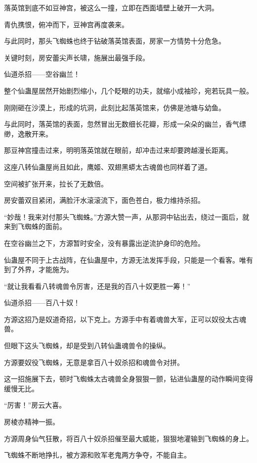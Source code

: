 
\begin{this_body}

落英馆到底不如豆神宫，被这么一撞，立即在西面墙壁上破开一大洞。

青仇携恨，俯冲而下，豆神宫再度袭来。

与此同时，那头飞蜘蛛也终于钻破落英馆表面，房家一方情势十分危急。

关键时刻，房安蕾尖声长啸，施展出最强手段。

仙道杀招——空谷幽兰！

整个仙蛊屋居然开始剧烈缩小，几个眨眼的功夫，就缩小成袖珍，宛若玩具一般。

刚刚砸在沙漠上，形成的坑洞，此刻比起落英馆来，仿佛是池塘与幼鱼。

与此同时，落英馆的表面，忽然冒出无数细长花瓣，形成一朵朵的幽兰，香气缥缈，逸散开来。

那豆神宫撞击过来，明明落英馆就在眼前，却冲击过来却要跨越漫长距离。

这座八转仙蛊屋尚且如此，鹰姬、双翅黑蟒太古魂兽也同样着了道。

空间被扩张开来，拉长了无数倍。

房安蕾双目紧闭，满脸汗水滚滚流下，面色苍白，极力维持杀招。

“妙哉！我来对付那头飞蜘蛛。”方源大赞一声，从那洞中钻出去，绕过一面后，就来到飞蜘蛛的面前。

在空谷幽兰之下，方源暂时安全，没有暴露出逆流护身印的危险。

仙蛊屋不同于上古战阵，在仙蛊屋中，方源无法发挥手段，只能是一个看客。唯有到了外界，才能施为。

“就让我看看八转魂兽令厉害，还是我的百八十奴更胜一筹！”

仙道杀招——百八十奴！

方源这招乃是奴道奇招，以下克上。方源手中有着魂兽大军，正可以奴役太古魂兽。

但眼下这头飞蜘蛛，却是受到八转仙蛊魂兽令的操纵。

方源要奴役飞蜘蛛，无意是拿百八十奴杀招和魂兽令对拼。

这一招施展下去，顿时飞蜘蛛太古魂兽全身狠狠一颤，钻进仙蛊屋的动作瞬间变得缓慢无比。

“厉害！”房云大喜。

房棱亦精神一振。

方源周身仙气狂散，将百八十奴杀招催至最大威能，狠狠地灌输到飞蜘蛛的身上。

飞蜘蛛不断地挣扎，被方源和败军老鬼两方争夺，不能自主。


\end{this_body}
